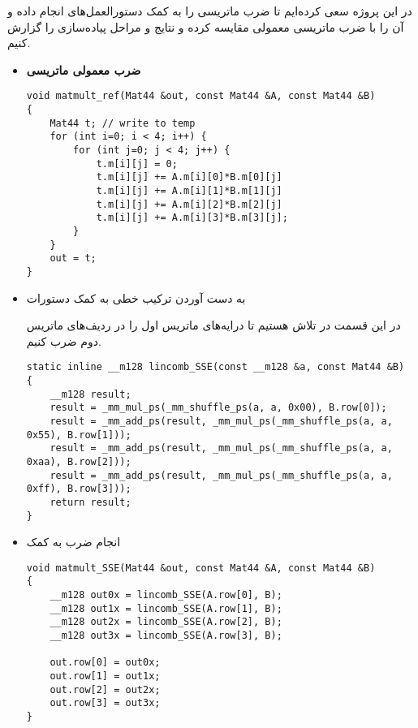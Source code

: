
در این پروژه سعی کرده‌ایم تا ضرب ماتریسی را به کمک دستورالعمل‌های  انجام داده و آن را با ضرب ماتریسی معمولی مقایسه کرده و نتایج و مراحل پیاده‌سازی را گزارش کنیم.

\begin{itemize}
	\item \textbf{ضرب معمولی ماتریسی}
	\begin{Verbatim}[tabsize=4]
void matmult_ref(Mat44 &out, const Mat44 &A, const Mat44 &B)
{
	Mat44 t; // write to temp
	for (int i=0; i < 4; i++) {
		for (int j=0; j < 4; j++) {
			t.m[i][j] = 0;
			t.m[i][j] += A.m[i][0]*B.m[0][j] 
			t.m[i][j] += A.m[i][1]*B.m[1][j]
			t.m[i][j] += A.m[i][2]*B.m[2][j]
			t.m[i][j] += A.m[i][3]*B.m[3][j];
		}
	}
	out = t;
}
	\end{Verbatim}
	\item به دست آوردن ترکیب خطی به کمک دستورات 
	
	در این قسمت در تلاش هستیم تا درایه‌های ماتریس اول را در ردیف‌های ماتریس دوم ضرب کنیم.
	\begin{Verbatim}[tabsize=4]
static inline __m128 lincomb_SSE(const __m128 &a, const Mat44 &B)
{
	__m128 result;
	result = _mm_mul_ps(_mm_shuffle_ps(a, a, 0x00), B.row[0]);
	result = _mm_add_ps(result, _mm_mul_ps(_mm_shuffle_ps(a, a, 0x55), B.row[1]));
	result = _mm_add_ps(result, _mm_mul_ps(_mm_shuffle_ps(a, a, 0xaa), B.row[2]));
	result = _mm_add_ps(result, _mm_mul_ps(_mm_shuffle_ps(a, a, 0xff), B.row[3]));
	return result;
}
	\end{Verbatim}
	\item انجام ضرب به کمک 
	\begin{Verbatim}[tabsize=4]
void matmult_SSE(Mat44 &out, const Mat44 &A, const Mat44 &B)
{
	__m128 out0x = lincomb_SSE(A.row[0], B);
	__m128 out1x = lincomb_SSE(A.row[1], B);
	__m128 out2x = lincomb_SSE(A.row[2], B);
	__m128 out3x = lincomb_SSE(A.row[3], B);
	
	out.row[0] = out0x;
	out.row[1] = out1x;
	out.row[2] = out2x;
	out.row[3] = out3x;
}
	\end{Verbatim}
\end{itemize}